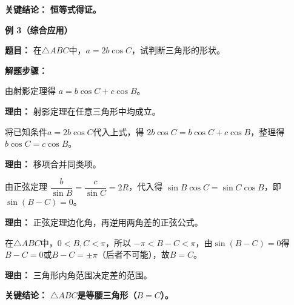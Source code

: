 \begin{examplebox}
	\textbf{\textcolor{CExample}{关键结论：}} \textbf{恒等式得证。}

	\medskip
	\textbf{\textcolor{CExample}{例 3（综合应用）}}

	\textbf{\textcolor{CExample}{题目：}} 在$\triangle ABC$中，$a=2b\cos C$，试判断三角形的形状。

	\textbf{\textcolor{CExample}{解题步骤：}}
	\begin{description}[style=nextline, leftmargin=2.8em, labelsep=0.5em, itemsep=0.45em]
		\item[\textbf{第一步（引入射影定理）：}] 由射影定理得 $a = b\cos C + c\cos B$。
		      \par\textbf{理由：}
		      射影定理在任意三角形中均成立。
		\item[\textbf{第二步（联立条件）：}] 将已知条件$a=2b\cos C$代入上式，得 $2b\cos C = b\cos C + c\cos B$，整理得 $b\cos C = c\cos B$。
		      \par\textbf{理由：}
		      移项合并同类项。
		\item[\textbf{第三步（边化角）：}] 由正弦定理 $\dfrac{b}{\sin B}=\dfrac{c}{\sin C}=2R$，代入得 $\sin B\cos C = \sin C\cos B$，即 $\sin(B-C)=0$。
		      \par\textbf{理由：}
		      正弦定理边化角，再逆用两角差的正弦公式。
		\item[\textbf{第四步（推出角关系）：}] 在$\triangle ABC$中，$0<B,C<\pi$，所以 $-\pi<B-C<\pi$，由$\sin(B-C)=0$得 $B-C=0$或$B-C=\pm\pi$（后者不可能），故$B=C$。
		      \par\textbf{理由：}
		      三角形内角范围决定差的范围。
	\end{description}

	\textbf{\textcolor{CExample}{关键结论：}} \textbf{$\triangle ABC$是等腰三角形（$B=C$）。}
\end{examplebox}